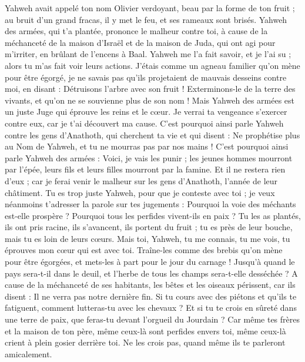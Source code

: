 \begin{multicols}{2}
Yahweh avait appelé ton nom Olivier verdoyant, beau par la forme de ton fruit ; au bruit d'un grand fracas, il y met le feu, et ses rameaux sont brisés.
Yahweh des armées, qui t'a plantée, prononce le malheur contre toi, à cause de la méchanceté de la maison d'Israël et de la maison de Juda, qui ont agi pour m'irriter, en brûlant de l'encens à Baal.
Yahweh me l'a fait savoir, et je l'ai su ; alors tu m'as fait voir leurs actions.
J'étais comme un agneau familier qu'on mène pour être égorgé, je ne savais pas qu'ils projetaient de mauvais desseins contre moi, en disant : Détruisons l'arbre avec son fruit ! Exterminons-le de la terre des vivants, et qu'on ne se souvienne plus de son nom !
Mais Yahweh des armées est un juste Juge qui éprouve les reins et le cœur. Je verrai ta vengeance s'exercer contre eux, car je t'ai découvert ma cause.
C'est pourquoi ainsi parle Yahweh contre les gens d'Anathoth, qui cherchent ta vie et qui disent : Ne prophétise plus au Nom de Yahweh, et tu ne mourras pas par nos mains !
C'est pourquoi ainsi parle Yahweh des armées : Voici, je vais les punir ; les jeunes hommes mourront par l'épée, leurs fils et leurs filles mourront par la famine.
Et il ne restera rien d'eux ; car je ferai venir le malheur sur les gens d'Anathoth, l'année de leur châtiment.
\VerseOne{}Tu es trop juste Yahweh, pour que je conteste avec toi ; je veux néanmoins t'adresser la parole sur tes jugements : Pourquoi la voie des méchants est-elle prospère ? Pourquoi tous les perfides vivent-ils en paix ?
Tu les as plantés, ils ont pris racine, ils s'avancent, ils portent du fruit ; tu es près de leur bouche, mais tu es loin de leurs cœurs.
Mais toi, Yahweh, tu me connais, tu me vois, tu éprouves mon cœur qui est avec toi. Traîne-les comme des brebis qu'on mène pour être égorgées, et mets-les à part pour le jour du carnage !
Jusqu'à quand le pays sera-t-il dans le deuil, et l'herbe de tous les champs sera-t-elle desséchée ? A cause de la méchanceté de ses habitants, les bêtes et les oiseaux périssent, car ils disent : Il ne verra pas notre dernière fin.
Si tu cours avec des piétons et qu'ils te fatiguent, comment lutteras-tu avec les chevaux ? Et si tu te crois en sûreté dans une terre de paix, que feras-tu devant l'orgueil du Jourdain ?
Car même tes frères et la maison de ton père, même ceux-là sont perfides envers toi, même ceux-là crient à plein gosier derrière toi. Ne les crois pas, quand même ils te parleront amicalement.

\end{multicols}
